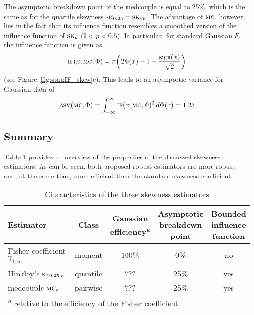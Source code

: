 The asymptotic breakdown point of the medcouple is equal to 25\%, which is the
same as for the quartile skewness $\stsc{SK}_{0.25}=\stsc{SK}_\stsc{YK}$. 
The advantage of $\stsc{MC}$, however, lies in the fact that its
influence function resembles a smoothed version of the influence function
of $\stsc{SK}_p$ ($0<p<0.5$). In particular, for standard Gaussian $F$, the    
influence function is given as
\[
    \stsc{IF}(x; \stsc{MC}, \Phi) = \pi \left(2\Phi(x) - 1 - \frac{\sign(x)}{\sqrt{2}}\right)
\]
(see Figure~\ref{fig:stat:IF_skew}c). This leads to an asymptotic variance for
Gaussian data of                                                                
\[
    \stsc{ASV}(\stsc{MC}, \Phi) = \int_{-\infty}^{\infty} \stsc{IF}(x;\stsc{MC},\Phi)^2 \dif \Phi(x) = 1.25
\]



\subsection{Summary}

Table \ref{tab:stat:skewness} provides an overview of the
properties of the discussed skewness estimators. As can be seen, both proposed
robust estimators are more robust and, at the same time, more efficient than 
the standard skewness coefficient.                                              

\begin{table}[h!]
    \centering
    \caption{Characteristics of the three skewness estimators}
    \label{tab:stat:skewness}
    \begin{tabular}{lcccc}
        \toprule
        Estimator
        & Class  
        & \subtab{c}{Gaussian\\ efficiency\textsuperscript{\textit{a}}}
        & \subtab{c}{Asymptotic\\ breakdown\\ point} 
        & \subtab{c}{Bounded\\ influence\\ function}
        \\\midrule
        Fisher coefficient $\gamma_{1;n}$     & moment   & 100\%        &  0\% & no
        \\\addlinespace
        Hinkley's $\stsc{SK}_{0.25;n}$      & quantile & \alert{???} & 25\% & yes
        \\\addlinespace
        medcouple $\stsc{MC}_n$             & pairwise & \alert{???} & 25\% & yes
        \\\bottomrule
        \multicolumn{5}{l}{\footnotesize\textsuperscript{\textit{a}} relative to the 
        efficiency of the Fisher coefficient}
    \end{tabular}
\end{table}

